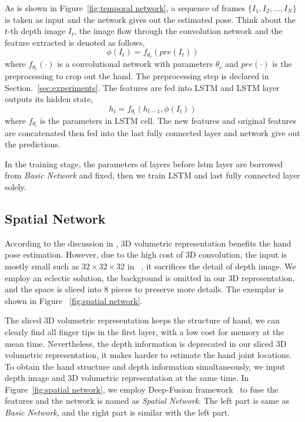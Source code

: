\documentclass[journal,comsoc]{IEEEtran}
\begin{document}
As is shown in Figure~\ref{fig:temporal network}, a sequence of frames $\{I_1, I_2, \dots, I_N\}$ is
taken as input and the network gives out the estimated pose. Think about the $t$-th depth image $I_t$,
the image flow through the convolution network and the feature extracted is denoted as follows,
\begin{equation}
\phi(I_t)=f_{\theta_c}(pre(I_t))
\end{equation}
where $f_{\theta_c}(\cdot)$ is a convolutional network with parameters $\theta_c$ and
$pre(\cdot)$ is the preprocessing to crop out the hand. The preprocessing step is declared
in Section.~\ref{sec:experiments}. The features are fed into LSTM and LSTM layer outputs its hidden
state,
\begin{equation}
h_t=f_{\theta_l}(h_{t-1}, \phi(I_t))
\end{equation}
where $f_{\theta_l}$ is the parameters in LSTM cell. The new features and original features
are concatenated then fed into the last fully connected layer and network give out the predictions.

In the training stage, the parameters of layers before lstm layer are borrowed from \emph{Basic Network}
and fixed, then we train LSTM and last fully connected layer solely.

\subsection{Spatial Network}\label{sec:spatial network}
According to the discussion in \cite{supancic2015depth, deng2017hand3d, ge2017_3D}, 3D
volumetric representation benefits the hand pose estimation. However, due to the high
cost of 3D convolution, the input is mostly small such as $32 \times 32 \times 32$ in
~\cite{deng2017hand3d, ge2017_3D}, it sacrifices the detail of depth image. We employ
an eclectic solution, the background is omitted in our 3D representation, and the space
is sliced into 8 pieces to preserve more details. The exemplar is shown in Figure
~\ref{fig:spatial network}.

The sliced 3D volumetric representation keeps the structure of hand, we can clearly find all
finger tips in the first layer, with a low cost for memory at the mean time. Nevertheless,
the depth information is deprecated in our sliced 3D volumetric representation, it makes harder
to estimate the hand joint locations. To obtain the hand structure and depth
information simultaneously, we input depth image and 3D volumetric representation at the
same time. In Figure~\ref{fig:spatial network}, we employ Deep-Fusion
framework~\cite{Chen_2017_CVPR} to fuse the features and the network is named as \emph{Spatial Network}.
The left part is same as \emph{Basic Network}, and the right part is similar with the left part.
\end{document}
